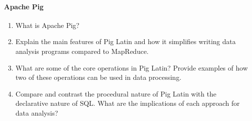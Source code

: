 \paragraph*{Apache Pig}
\begin{enumerate}
	\item What is Apache Pig?
	\item Explain the main features of Pig Latin and how it simplifies writing data analysis programs compared to MapReduce.
	\item What are some of the core operations in Pig Latin? Provide examples of how two of these operations can be used in data processing.
	\item Compare and contrast the procedural nature of Pig Latin with the declarative nature of SQL. What are the implications of each approach for data analysis?
\end{enumerate}
